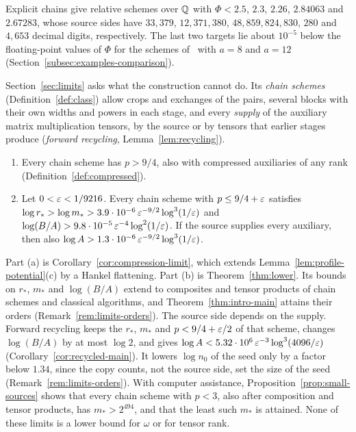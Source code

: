 \begin{theorem}
\label{thm:intro-examples}
Explicit chains give relative schemes over \(\mathbb Q\) with \(\Phi<2.5\),
\(2.3\), \(2.26\), \(2.84063\) and \(2.67283\), whose source sides have
\(33{,}379\), \(12{,}371{,}380\), \(48{,}859{,}824{,}830\), \(280\) and
\(4{,}653\) decimal digits, respectively. The last two targets lie about
\(10^{-5}\) below the floating-point values of \(\Phi\) for the schemes
of~\citep[Table~2]{FinCon26} with \(a=8\) and \(a=12\)
(Section~\ref{subsec:examples-comparison}).
\end{theorem}

Section~\ref{sec:limits} asks what the construction cannot do. Its
\emph{chain schemes} (Definition~\ref{def:class}) allow crops and
exchanges of the pairs, several blocks with their own widths and powers
in each stage, and every \emph{supply} of the auxiliary matrix
multiplication tensors, by the source or by tensors that earlier stages
produce (\emph{forward recycling}, Lemma~\ref{lem:recycling}).

\begin{theorem}\label{thm:intro-limits}
\leavevmode
\begin{enumerate}
\item[(a)] Every chain scheme has \(p>9/4\), also with compressed
auxiliaries of any rank (Definition~\ref{def:compressed}).
\item[(b)] Let \(0<\varepsilon<1/9216\). Every chain scheme with
\(p\le9/4+\varepsilon\) satisfies
\(\log r_*>\log m_*>3.9\cdot10^{-6}\,\varepsilon^{-9/2}\log^3(1/\varepsilon)\) and
\(\log(B/A)>9.8\cdot10^{-5}\,\varepsilon^{-4}\log^2(1/\varepsilon)\). If the source
supplies every auxiliary, then also
\(\log A>1.3\cdot10^{-6}\,\varepsilon^{-9/2}\log^3(1/\varepsilon)\).
\end{enumerate}
\end{theorem}

Part (a) is Corollary~\ref{cor:compression-limit}, which extends
Lemma~\ref{lem:profile-potential}(c) by a Hankel flattening. Part (b) is
Theorem~\ref{thm:lower}. Its bounds on \(r_*\), \(m_*\) and
\(\log(B/A)\) extend to composites and tensor products of chain schemes
and classical algorithms, and Theorem~\ref{thm:intro-main} attains their
orders (Remark~\ref{rem:limits-orders}). The source side depends on the
supply. Forward recycling keeps the \(r_*\), \(m_*\) and
\(p<9/4+\varepsilon/2\) of that scheme, changes \(\log(B/A)\) by at most
\(\log2\), and gives \(\log A<5.32\cdot10^6\,\varepsilon^{-3}\log^3(4096/\varepsilon)\)
(Corollary~\ref{cor:recycled-main}). It lowers \(\log n_0\) of the
seed only by a factor below \(1.34\), since the copy counts, not the
source side, set the size of the seed (Remark~\ref{rem:limits-orders}).
With computer assistance, Proposition~\ref{prop:small-sources} shows that every chain scheme with
\(p<3\), also after composition and tensor products, has
\(m_*>2^{494}\), and that the least such \(m_*\) is attained. None of
these limits is a lower bound for \(\omega\) or for tensor rank.

